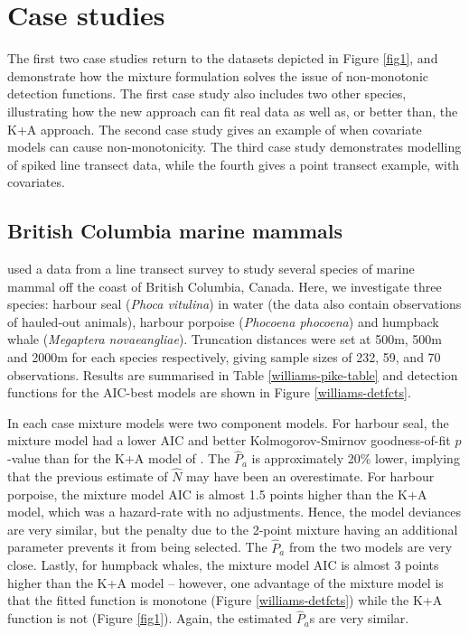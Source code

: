 \documentclass[useAMS,referee,usenatbib]{biom}
\begin{document}
\section{Case studies}
\label{s:data}

The first two case studies return to the datasets depicted in Figure \ref{fig1}, and demonstrate how the mixture formulation solves the issue of non-monotonic detection functions.  The first case study also includes two other species, illustrating how the new approach can fit real data as well as, or better than, the K+A approach. The second case study gives an example of when covariate models can cause non-monotonicity.  The third case study demonstrates modelling of spiked line transect data, while the fourth gives a point transect example, with covariates.

\subsection{British Columbia marine mammals}

\cite{Williams:2007tc} used a data from a line transect survey to study several species of marine mammal off the coast of British Columbia, Canada. Here, we investigate three species: harbour seal (\textit{Phoca vitulina}) in water (the data also contain observations of hauled-out animals), harbour porpoise (\textit{Phocoena phocoena}) and humpback whale (\textit{Megaptera novaeangliae}). Truncation distances were set at 500m, 500m and 2000m for each species respectively, giving sample sizes of 232, 59, and 70 observations. Results are summarised in Table \ref{williams-pike-table} and detection functions for the AIC-best models are shown in Figure \ref{williams-detfcts}.

In each case mixture models were two component models.  For harbour seal, the mixture model had a lower AIC and better Kolmogorov-Smirnov goodness-of-fit $p$-value than for the K+A model of \cite{Williams:2007tc}.  The $\hat{P}_a$ is approximately 20\% lower, implying that the previous estimate of $\hat{N}$ may have been an overestimate.  For harbour porpoise, the mixture model AIC is almost 1.5 points higher than the K+A model, which was a hazard-rate with no adjustments.  Hence, the model deviances are very similar, but the penalty due to the 2-point mixture having an additional parameter prevents it from being selected.  The $\hat{P}_a$ from the two models are very close.  Lastly, for humpback whales, the mixture model AIC is almost 3 points higher than the K+A model -- however, one advantage of the mixture model is that the fitted function is monotone (Figure \ref{williams-detfcts}) while the K+A function is not (Figure \ref{fig1}).  Again, the estimated $\hat{P}_a$s are very similar.
\end{document}
